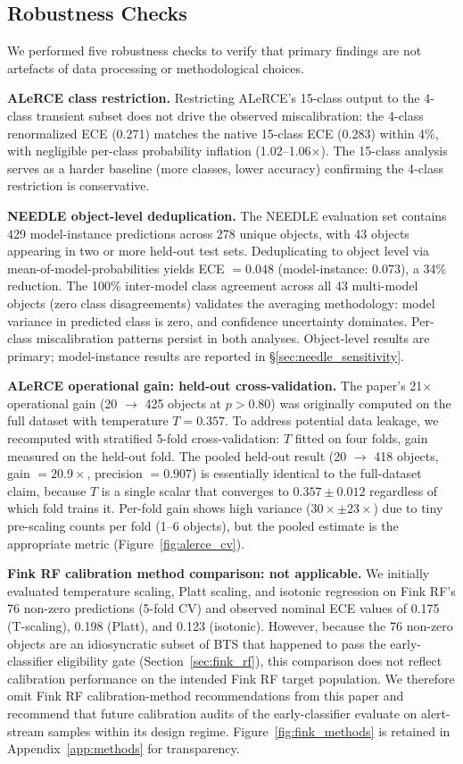 \documentclass[twocolumn]{aastex631}
\begin{document}
\subsection{Robustness Checks} \label{sec:robustness}

We performed five robustness checks to verify that primary findings are not artefacts of data processing or methodological choices.

\textbf{ALeRCE class restriction.} Restricting ALeRCE's 15-class output to the 4-class transient subset does not drive the observed miscalibration: the 4-class renormalized ECE (0.271) matches the native 15-class ECE (0.283) within 4\%, with negligible per-class probability inflation (1.02--1.06$\times$). The 15-class analysis serves as a harder baseline (more classes, lower accuracy) confirming the 4-class restriction is conservative.

\textbf{NEEDLE object-level deduplication.} The NEEDLE evaluation set contains 429 model-instance predictions across 278 unique objects, with 43 objects appearing in two or more held-out test sets. Deduplicating to object level via mean-of-model-probabilities yields ECE $= 0.048$ (model-instance: 0.073), a 34\% reduction. The 100\% inter-model class agreement across all 43 multi-model objects (zero class disagreements) validates the averaging methodology: model variance in predicted class is zero, and confidence uncertainty dominates. Per-class miscalibration patterns persist in both analyses. Object-level results are primary; model-instance results are reported in \S\ref{sec:needle_sensitivity}.

\textbf{ALeRCE operational gain: held-out cross-validation.} The paper's 21$\times$ operational gain (20 $\to$ 425 objects at $p > 0.80$) was originally computed on the full dataset with temperature $T = 0.357$. To address potential data leakage, we recomputed with stratified 5-fold cross-validation: $T$ fitted on four folds, gain measured on the held-out fold. The pooled held-out result (20 $\to$ 418 objects, gain $= 20.9\times$, precision $= 0.907$) is essentially identical to the full-dataset claim, because $T$ is a single scalar that converges to $0.357 \pm 0.012$ regardless of which fold trains it. Per-fold gain shows high variance ($30\times \pm 23\times$) due to tiny pre-scaling counts per fold (1--6 objects), but the pooled estimate is the appropriate metric (Figure~\ref{fig:alerce_cv}).

\textbf{Fink RF calibration method comparison: not applicable.} We initially evaluated temperature scaling, Platt scaling, and isotonic regression on Fink RF's 76 non-zero predictions (5-fold CV) and observed nominal ECE values of 0.175 (T-scaling), 0.198 (Platt), and 0.123 (isotonic). However, because the 76 non-zero objects are an idiosyncratic subset of BTS that happened to pass the early-classifier eligibility gate (Section~\ref{sec:fink_rf}), this comparison does not reflect calibration performance on the intended Fink RF target population. We therefore omit Fink RF calibration-method recommendations from this paper and recommend that future calibration audits of the early-classifier evaluate on alert-stream samples within its design regime. Figure~\ref{fig:fink_methods} is retained in Appendix~\ref{app:methods} for transparency.
\end{document}
